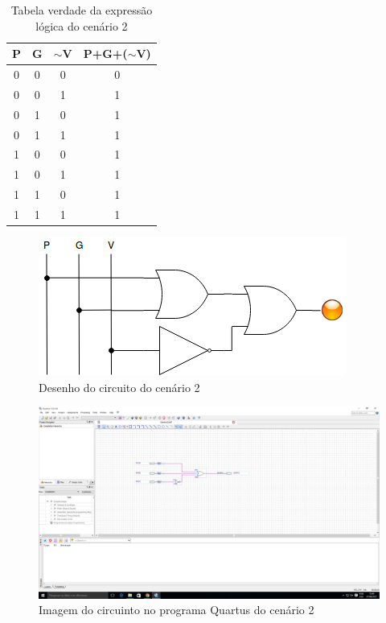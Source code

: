 	\begin{table}[h]
		\centering
		\caption{Tabela verdade da expressão lógica do cenário 2}\label{table:tabelaVerdade2}
		\begin{tabular}{c|c|c|c}
			\textbf{P} & \textbf{G} & \textbf{$\sim$V} & \textbf{P+G+($\sim$V)} \\
			\hline
			0 & 0 & 0 & 0\\\hline
			0 & 0 & 1 & 1\\\hline
			0 & 1 & 0 & 1\\\hline
			0 & 1 & 1 & 1\\\hline
			1 & 0 & 0 & 1\\\hline
			1 & 0 & 1 & 1\\\hline
			1 & 1 & 0 & 1\\\hline
			1 & 1 & 1 & 1
		\end{tabular}
	\end{table}

	\begin{figure}[H]
	    \centering
		\caption{\label{fig:desenhoCircuito2}Desenho do circuito do cenário 2}
		\includegraphics{img/cenario2/desenhoCircuito}
	\end{figure}


	\begin{figure}[H]
	    \centering
		\caption{\label{fig:printCircuito2}Imagem do circuinto no programa Quartus do cenário 2}
		\includegraphics[width=1\textwidth]{img/cenario2/printCircuito}
	\end{figure}

